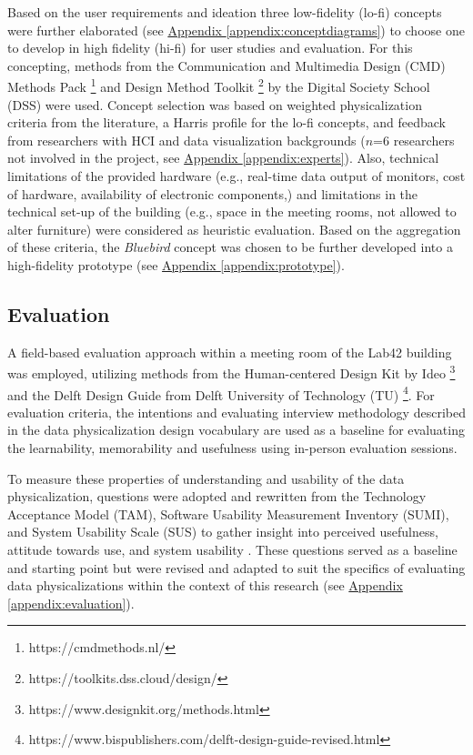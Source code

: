 Based on the user requirements and ideation three low-fidelity (lo-fi) concepts were further elaborated (see \hyperref[appendix:conceptdiagrams]{Appendix \ref*{appendix:conceptdiagrams}}) to choose one to develop in high fidelity (hi-fi) for user studies and evaluation. For this concepting, methods from the Communication and Multimedia Design (CMD) Methods Pack \footnote{https://cmdmethods.nl/} and Design Method Toolkit \footnote{https://toolkits.dss.cloud/design/} by the Digital Society School (DSS) were used. Concept selection was based on weighted physicalization criteria from the literature, a Harris profile for the lo-fi concepts, and feedback from researchers with HCI and data visualization backgrounds ($n$=6 researchers not involved in the project, see \hyperref[appendix:experts]{Appendix \ref*{appendix:experts}}). Also, technical limitations of the provided hardware (e.g., real-time data output of monitors, cost of hardware, availability of electronic components,) and limitations in the technical set-up of the building (e.g., space in the meeting rooms, not allowed to alter furniture) were considered as heuristic evaluation. Based on the aggregation of these criteria, the \textit{Bluebird} concept was chosen to be further developed into a high-fidelity prototype (see \hyperref[appendix:prototype]{Appendix \ref*{appendix:prototype}}).

\subsection{Evaluation}
\label{sec:evaluation}

A field-based evaluation approach within a meeting room of the Lab42 building was employed, utilizing methods from the Human-centered Design Kit by Ideo \footnote{https://www.designkit.org/methods.html} and the Delft Design Guide from Delft University of Technology (TU) \footnote{https://www.bispublishers.com/delft-design-guide-revised.html}. For evaluation criteria, the intentions and evaluating interview methodology described in the data physicalization design vocabulary \cite{jansen_evaluating_2013,ranasinghe_encoding_2023} are used as a baseline for evaluating the learnability, memorability and usefulness using in-person evaluation sessions. 

To measure these properties of understanding and usability of the data physicalization, questions were adopted and rewritten from the Technology Acceptance Model (TAM), Software Usability Measurement Inventory (SUMI), and System Usability Scale (SUS) to gather insight into perceived usefulness, attitude towards use, and system usability \cite{davis_perceived_1989, brooke_sus_1996}. These questions served as a baseline and starting point but were revised and adapted to suit the specifics of evaluating data physicalizations within the context of this research (see \hyperref[appendix:evaluation]{Appendix \ref*{appendix:evaluation}}).

